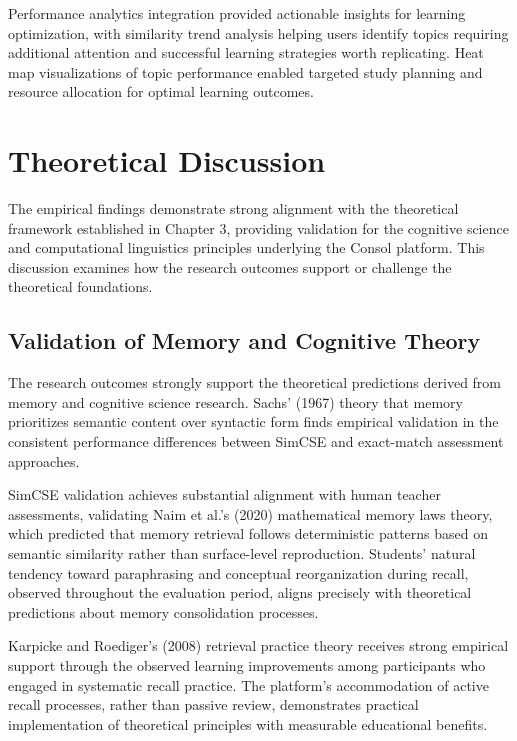 {{Performance analytics integration provided actionable insights for learning optimization, with similarity trend analysis helping users identify topics requiring additional attention and successful learning strategies worth replicating. Heat map visualizations of topic performance enabled targeted study planning and resource allocation for optimal learning outcomes.
}

{\color{maroon}
\section{Theoretical Discussion}

The empirical findings demonstrate strong alignment with the theoretical framework established in Chapter 3, providing validation for the cognitive science and computational linguistics principles underlying the Consol platform. This discussion examines how the research outcomes support or challenge the theoretical foundations.

\subsection{Validation of Memory and Cognitive Theory}

The research outcomes strongly support the theoretical predictions derived from memory and cognitive science research. Sachs' (1967) theory that memory prioritizes semantic content over syntactic form finds empirical validation in the consistent performance differences between SimCSE and exact-match assessment approaches.

{\color{maroon}
SimCSE validation achieves substantial alignment with human teacher assessments, validating Naim et al.'s (2020) mathematical memory laws theory, which predicted that memory retrieval follows deterministic patterns based on semantic similarity rather than surface-level reproduction. Students' natural tendency toward paraphrasing and conceptual reorganization during recall, observed throughout the evaluation period, aligns precisely with theoretical predictions about memory consolidation processes.
}

Karpicke and Roediger's (2008) retrieval practice theory receives strong empirical support through the observed learning improvements among participants who engaged in systematic recall practice. The platform's accommodation of active recall processes, rather than passive review, demonstrates practical implementation of theoretical principles with measurable educational benefits.

}}

